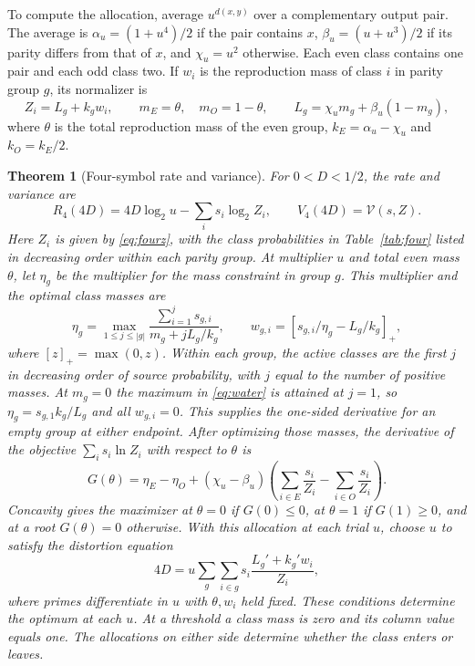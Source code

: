 \documentclass[11pt,letterpaper]{article}
\newtheorem{theorem}{Theorem}
\theoremstyle{definition}
\newcommand{\Vfun}{\mathcal V}
\begin{document}
To compute the allocation, average $u^{d(x,y)}$ over a complementary output pair. The average is $\alpha_u=(1+u^4)/2$ if the pair contains $x$, $\beta_u=(u+u^3)/2$ if its parity differs from that of $x$, and $\chi_u=u^2$ otherwise. Each even class contains one pair and each odd class two. If $w_i$ is the reproduction mass of class $i$ in parity group $g$, its normalizer is
\begin{equation}
 Z_i=L_g+k_gw_i,\qquad m_E=\theta,\quad m_O=1-\theta,\qquad
 L_g=\chi_u m_g+\beta_u(1-m_g),\label{eq:fourz}
\end{equation}
where $\theta$ is the total reproduction mass of the even group, $k_E=\alpha_u-\chi_u$ and $k_O=k_E/2$.

\begin{theorem}[Four-symbol rate and variance]\label{thm:four}
For $0<D<1/2$, the rate and variance are
\[
 R_4(4D)=4D\log_2u-\sum_i s_i\log_2Z_i,\qquad V_4(4D)=\Vfun(s,Z).
\]
Here $Z_i$ is given by \eqref{eq:fourz}, with the class probabilities in Table~\ref{tab:four} listed in decreasing order within each parity group. At multiplier $u$ and total even mass $\theta$, let $\eta_g$ be the multiplier for the mass constraint in group $g$. This multiplier and the optimal class masses are
\begin{equation}
 \eta_g=\max_{1\le j\le |g|}\frac{\sum_{i=1}^j s_{g,i}}{m_g+jL_g/k_g},\qquad
 w_{g,i}=[s_{g,i}/\eta_g-L_g/k_g]_+,                          \label{eq:water}
\end{equation}
where $[z]_+=\max(0,z)$. Within each group, the active classes are the first $j$ in decreasing order of source probability, with $j$ equal to the number of positive masses. At $m_g=0$ the maximum in \eqref{eq:water} is attained at $j=1$, so $\eta_g=s_{g,1}k_g/L_g$ and all $w_{g,i}=0$. This supplies the one-sided derivative for an empty group at either endpoint. After optimizing those masses, the derivative of the objective $\sum_i s_i\ln Z_i$ with respect to $\theta$ is
\begin{equation}
 G(\theta)=\eta_E-\eta_O+(\chi_u-\beta_u)
      \left(\sum_{i\in E}\frac{s_i}{Z_i}-\sum_{i\in O}\frac{s_i}{Z_i}\right).
                                                                     \label{eq:G}
\end{equation}
Concavity gives the maximizer at $\theta=0$ if $G(0)\le0$, at $\theta=1$ if $G(1)\ge0$, and at a root $G(\theta)=0$ otherwise. With this allocation at each trial $u$, choose $u$ to satisfy the distortion equation
\begin{equation}
 4D=u\sum_{g}\sum_{i\in g}s_i\frac{L_g'+k_g'w_i}{Z_i},          \label{eq:fourD}
\end{equation}
where primes differentiate in $u$ with $\theta,w_i$ held fixed. These conditions determine the optimum at each $u$. At a threshold a class mass is zero and its column value equals one. The allocations on either side determine whether the class enters or leaves.
\end{theorem}
\end{document}
